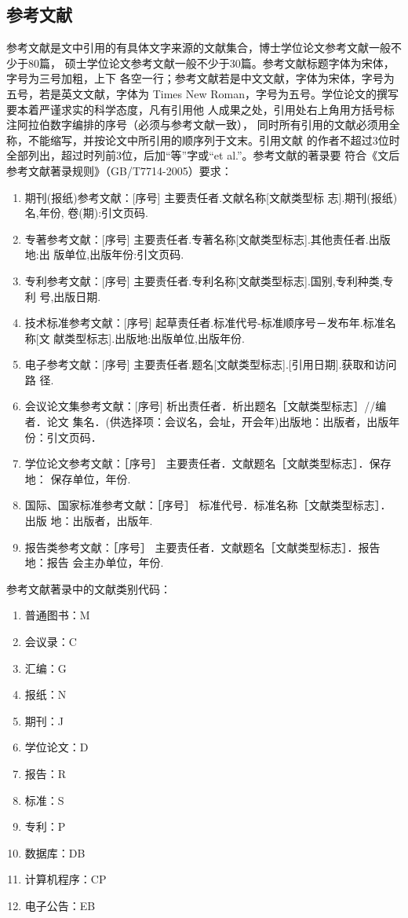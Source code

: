 \subsection{参考文献}

参考文献是文中引用的有具体文字来源的文献集合，博士学位论文参考文献一般不少于80篇，
硕士学位论文参考文献一般不少于30篇。参考文献标题字体为宋体，字号为三号加粗，上下
各空一行；参考文献若是中文文献，字体为宋体，字号为五号，若是英文文献，字体为
Times New Roman，字号为五号。学位论文的撰写要本着严谨求实的科学态度，凡有引用他
人成果之处，引用处右上角用方括号标注阿拉伯数字编排的序号（必须与参考文献一致），
同时所有引用的文献必须用全称，不能缩写，并按论文中所引用的顺序列于文末。引用文献
的作者不超过3位时全部列出，超过时列前3位，后加“等”字或“et al.”。参考文献的著录要
符合《文后参考文献著录规则》（GB/T7714-2005）要求：

\begin{enumerate}
\item 期刊(报纸)参考文献：[序号] 主要责任者.文献名称[文献类型标
  志].期刊(报纸)名,年份, 卷(期):引文页码.
\item 专著参考文献：[序号] 主要责任者.专著名称[文献类型标志].其他责任者.出版地:出
  版单位,出版年份:引文页码.
\item 专利参考文献：[序号] 主要责任者.专利名称[文献类型标志].国别,专利种类,专利
  号,出版日期.
\item 技术标准参考文献：[序号] 起草责任者.标准代号-标准顺序号－发布年.标准名称[文
  献类型标志].出版地:出版单位,出版年份.
\item 电子参考文献：[序号] 主要责任者.题名[文献类型标志].[引用日期].获取和访问路
  径.
\item 会议论文集参考文献：[序号] 析出责任者．析出题名［文献类型标志］//编者．论文
  集名．(供选择项：会议名，会址，开会年)出版地：出版者，出版年份：引文页码．
\item 学位论文参考文献：［序号］ 主要责任者．文献题名［文献类型标志］．保存地：
  保存单位，年份.
\item 国际、国家标准参考文献：［序号］ 标准代号．标准名称［文献类型标志］．出版
  地：出版者，出版年.
\item 报告类参考文献：［序号］ 主要责任者．文献题名［文献类型标志］．报告地：报告
  会主办单位，年份.
\end{enumerate}

参考文献著录中的文献类别代码：
\begin{enumerate}
\item 普通图书：M
\item 会议录：C
\item 汇编：G
\item 报纸：N
\item 期刊：J
\item 学位论文：D
\item 报告：R
\item 标准：S
\item 专利：P
\item 数据库：DB
\item 计算机程序：CP
\item 电子公告：EB
\end{enumerate}

